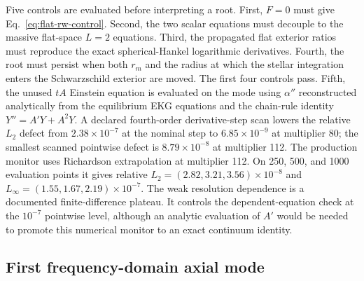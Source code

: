 Five controls are evaluated before interpreting a root.  First, $F=0$ must
give Eq.~\eqref{eq:flat-rw-control}.  Second, the two scalar equations must
decouple to the massive flat-space $L=2$ equations.  Third, the propagated
flat exterior ratios must reproduce the exact spherical-Hankel logarithmic
derivatives.  Fourth, the root must persist when both $r_m$ and the radius at
which the stellar integration enters the Schwarzschild exterior are moved.
The first four controls pass. Fifth, the unused $tA$ Einstein equation is
evaluated on the mode using $\alpha''$ reconstructed analytically from the
equilibrium EKG equations and the chain-rule identity $Y''=A'Y+A^2Y$.
A declared fourth-order derivative-step scan lowers the relative $L_2$
defect from $2.38\times10^{-7}$ at the nominal step to
$6.85\times10^{-9}$ at multiplier 80; the smallest scanned pointwise defect
is $8.79\times10^{-8}$ at multiplier 112. The production monitor uses
Richardson extrapolation at multiplier 112. On 250, 500, and 1000 evaluation
points it gives relative $L_2=(2.82,3.21,3.56)\times10^{-8}$ and
$L_\infty=(1.55,1.67,2.19)\times10^{-7}$. The weak resolution dependence is
a documented finite-difference plateau. It controls the dependent-equation
check at the $10^{-7}$ pointwise level, although an analytic evaluation of
$A'$ would be needed to promote this numerical monitor to an exact continuum
identity.

\subsection{First frequency-domain axial mode}

